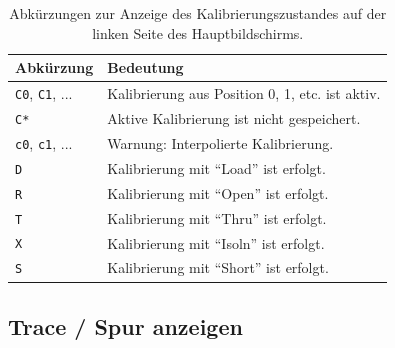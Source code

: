 \documentclass[twoside,a4paper,11pt,halfparskip,DIV=11,notitlepage]{scrartcl}
\begin{document}
\begin{table}
    \begin{center}
        \caption{Abkürzungen zur Anzeige des Kalibrierungszustandes auf der linken Seite des
        Hauptbildschirms.}
        \label{tab:calibration}
        \begin{tabular}{ll}\toprule
            \textbf{Abkürzung} & \textbf{Bedeutung}\\\midrule
            \texttt{C0}, \texttt{C1}, ... & Kalibrierung aus Position 0, 1, etc. ist aktiv.\\
            \texttt{C*} & Aktive Kalibrierung ist nicht gespeichert.\\
            \texttt{c0}, \texttt{c1}, ... & Warnung: Interpolierte Kalibrierung.\\
            \texttt{D} & Kalibrierung mit ``Load'' ist erfolgt.\\
            \texttt{R} & Kalibrierung mit ``Open'' ist erfolgt.\\
            \texttt{T} & Kalibrierung mit ``Thru'' ist erfolgt.\\
            \texttt{X} & Kalibrierung mit ``Isoln'' ist erfolgt.\\
            \texttt{S} & Kalibrierung mit ``Short'' ist erfolgt.\\
            \bottomrule
        \end{tabular}
    \end{center}
\end{table}

\subsection{Trace / Spur anzeigen}\label{sec:nanovnatraces}
\begin{center}\end{center}
\end{document}
